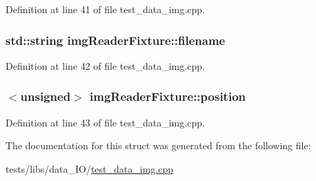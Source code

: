 Definition at line 41 of file test\-\_\-data\-\_\-img.\-cpp.

\hypertarget{structimg_reader_fixture_a7bb9220d55df2a55400424c5816ce6ac}{
\subsubsection[{filename}]{\setlength{\rightskip}{0pt plus 5cm}std\-::string img\-Reader\-Fixture\-::filename}}\label{structimg_reader_fixture_a7bb9220d55df2a55400424c5816ce6ac}


Definition at line 42 of file test\-\_\-data\-\_\-img.\-cpp.

\hypertarget{structimg_reader_fixture_a26f82b8a090501ba0b0fe56419416ee0}{
\subsubsection[{position}]{$<$unsigned$>$ img\-Reader\-Fixture\-::position}}\label{structimg_reader_fixture_a26f82b8a090501ba0b0fe56419416ee0}


Definition at line 43 of file test\-\_\-data\-\_\-img.\-cpp.



The documentation for this struct was generated from the following file\-:\begin{DoxyCompactItemize}
\item 
tests/libs/data\-\_\-\-I\-O/\hyperlink{test__data__img_8cpp}{test\-\_\-data\-\_\-img.\-cpp}\end{DoxyCompactItemize}
